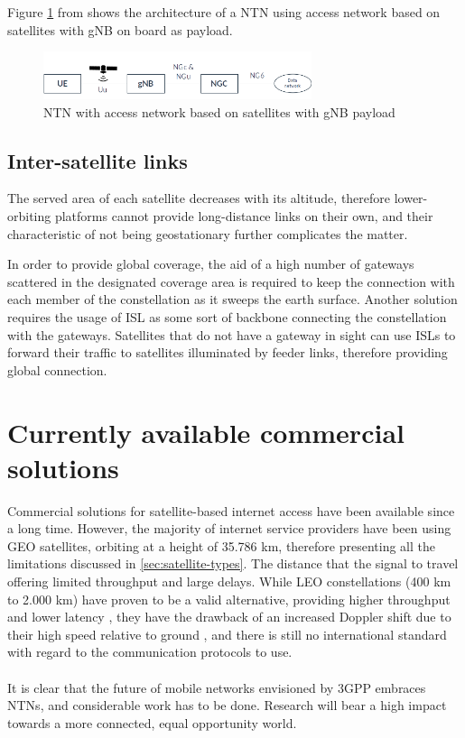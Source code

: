 Figure \ref{fig:ntn-gnb-onboard} from \cite{3gpp-tr-38.811} shows the architecture of a \ac{NTN} using access network based on satellites with \ac{gNB} on board as payload.

\begin{figure}[ht]
    \centering
    \includegraphics[width=0.7\textwidth]{res/ntn-bent-pipe.png}
    \caption{NTN with access network based on satellites with gNB payload \cite{3gpp-tr-38.811}}
    \label{fig:ntn-gnb-onboard}
\end{figure}

\subsection{Inter-satellite links}
The served area of each satellite decreases with its altitude, therefore lower-orbiting platforms cannot provide long-distance links on their own, and their characteristic of not being geostationary further complicates the matter.

In order to provide global coverage, the aid of a high number of gateways scattered in the designated coverage area is required to keep the connection with each member of the constellation as it sweeps the earth surface. Another solution requires the usage of \ac{ISL} as some sort of backbone connecting the constellation with the gateways. Satellites that do not have a gateway in sight can use \ac{ISL}s to forward their traffic to satellites illuminated by feeder links, therefore providing global connection. 

\section{Currently available commercial solutions}
Commercial solutions for satellite-based internet access have been available since a long time. However, the majority of internet service providers have been using \ac{GEO} satellites, orbiting at a height of 35.786 km, therefore presenting all the limitations discussed in \ref{sec:satellite-types}. The distance that the signal  to travel offering limited throughput and large delays. While \ac{LEO} constellations (400 km to 2.000 km) have proven to be a valid alternative, providing higher throughput and lower latency \cite{main-features-5g-nr-ntn-yun}, they have the drawback of an increased Doppler shift due to their high speed relative to ground \cite{satellite-communication-mmwave-giordani}, and there is still no international standard with regard to the communication protocols to use. 

\paragraph{}
It is clear that the future of mobile networks envisioned by \ac{3GPP} embraces \ac{NTN}s, and considerable work has to be done. Research will bear a high impact towards a more connected, equal opportunity world. 
